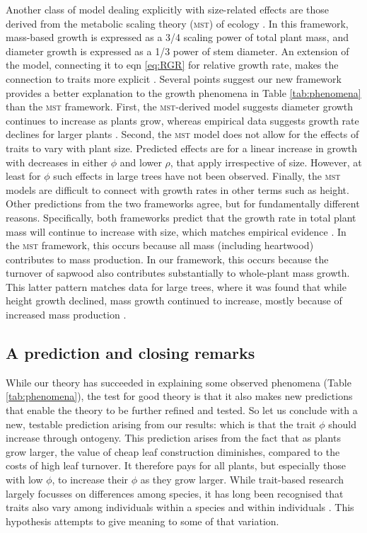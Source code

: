 \documentclass[a4paper,11pt]{article}
\begin{document}
Another class of model dealing explicitly with size-related effects are those derived from the metabolic scaling theory (\textsc{mst}) of ecology \citep{Enquist-1999, Enquist-2007}. In this framework, mass-based growth is expressed as a 3/4 scaling power of total plant mass, and diameter growth is expressed as a 1/3 power of stem diameter. An extension of the model, connecting it to eqn \ref{eq:RGR} for relative growth rate, makes the connection to traits more explicit \citep{Enquist-2007}. Several points suggest our new framework provides a better explanation to the growth phenomena in Table \ref{tab:phenomena} than the \textsc{mst} framework. First, the \textsc{mst}-derived model suggests diameter growth continues to increase as plants grow, whereas empirical data suggests growth rate declines for larger plants \citep{Herault-2011}. Second, the \textsc{mst} model does not allow for the effects of traits to vary with plant size. Predicted effects are for a linear increase in growth with decreases in either $\phi$ and lower $\rho$, that apply irrespective of size. However, at least for $\phi$ such effects in large trees have not been observed.  Finally, the \textsc{mst} models are difficult to connect with growth rates in other terms such as height. Other predictions from the two frameworks  agree, but for fundamentally different reasons. Specifically, both frameworks predict that the growth rate in total plant mass will continue to increase with size, which matches empirical evidence \citep{Stephenson-2014}. In the \textsc{mst} framework, this occurs because all mass (including heartwood) contributes to mass production. In our framework, this occurs because the turnover of sapwood also contributes substantially to whole-plant mass growth. This latter pattern matches data for large trees, where it was found that while height growth declined, mass growth continued to increase, mostly because of increased mass production \citep{Sillett-2010}.

\subsection{A prediction and closing remarks}
While our theory has succeeded in explaining some observed phenomena (Table \ref{tab:phenomena}), the test for good theory is that it also makes new predictions that enable the theory to be further refined and tested. So let us conclude with a new, testable prediction arising from our results: which is that the trait $\phi$ should increase through ontogeny. This prediction arises from the fact that as plants grow larger, the value of cheap leaf construction diminishes, compared to the costs of high leaf turnover. It therefore pays for all plants, but especially those with low $\phi$, to increase their $\phi$ as they grow larger. While trait-based research largely focusses on differences among species, it has long been recognised that traits also vary among individuals within a species and within individuals \citep{Westoby-2002}. This hypothesis attempts to give meaning to some of that variation.
\end{document}
